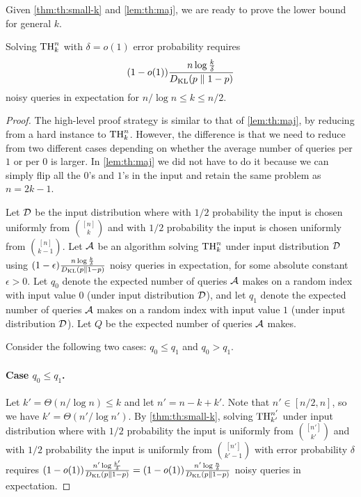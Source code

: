 Given \cref{thm:th:small-k} and \cref{lem:th:maj}, we are ready to prove the lower bound for general $k$.
\begin{theorem}
\label{thm:th:large-k}
  Solving $\Threshold{n}{k}$ with $
\delta = o(1)$ error probability requires
\[
(1-o(1))\frac{n \log \frac{k}{\delta}}{\DKL}
\]
noisy queries in expectation for $n/\log n \le k \le n / 2$.
\end{theorem}
\begin{proof}
  The high-level proof strategy is similar to that of \cref{lem:th:maj}, by reducing from a hard instance to $\Threshold{n}{k}$. However, the difference is that we need to reduce from two different cases depending on whether the average number of queries per $1$ or per $0$ is larger. In \cref{lem:th:maj} we did not have to do it because we can simply flip all the $0$'s and $1$'s in the input and retain the same problem as $n = 2k - 1$.

  Let $\cD$ be the input distribution where with $1/2$ probability the input is chosen uniformly from $\binom{[n]}{k}$ and with $1/2$ probability the input is chosen uniformly from $\binom{[n]}{k - 1}$. Let $\cA$ be an algorithm solving $\Threshold{n}{k}$ under input distribution $\cD$ using $(1-\epsilon)\frac{n \log \frac{k}{\delta}}{\DKL}$ noisy queries in expectation, for some absolute constant $\epsilon>0$. Let $q_0$ denote the expected number of queries $\cA$ makes on a random index with input value $0$ (under input distribution $\cD$), and let $q_1$ denote the expected number of queries $\cA$ makes on a random index with input value $1$ (under input distribution $\cD$). Let $Q$ be the expected number of queries $\cA$ makes.

  Consider the following two cases: $q_0\le q_1$ and $q_0>q_1$.

  \paragraph{Case $q_0 \le q_1$.}

  Let $k' = \Theta(n / \log n) \le k$ and let $n' = n - k + k'$. Note that $n' \in [n / 2, n]$, so we have $k' = \Theta(n' / \log n')$. By \cref{thm:th:small-k}, solving $\Threshold{n'}{k'}$ under input distribution where with $1/2$ probability the input is uniformly from $\binom{[n']}{k'}$ and with $1/2$ probability the input is uniformly from $\binom{[n']}{k' - 1}$ with error probability $\delta$ requires $(1-o(1))\frac{n' \log \frac{k'}{\delta}}{\DKL} = (1-o(1))\frac{n' \log \frac{n}{\delta}}{\DKL}$ noisy queries in expectation.


\end{proof}
